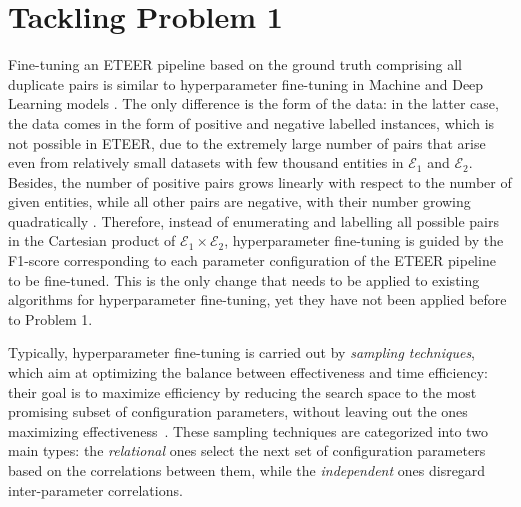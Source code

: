 \section{Tackling Problem 1}
\label{sec:problem-1}

Fine-tuning an ETEER pipeline based on the ground truth comprising all duplicate pairs is similar to hyperparameter fine-tuning in Machine and Deep Learning models \cite{DBLP:journals/ijon/YangS20}. The only difference is the form of the data: in the latter case, the data comes in the form of positive and negative labelled instances, which is not possible in ETEER, due to the extremely large number of pairs that arise even from relatively small datasets with few thousand entities in $\mathcal{E}_1$ and $\mathcal{E}_2$. Besides, the number of positive pairs grows linearly with respect to the number of given entities, while all other pairs are negative, with their number growing quadratically \cite{DBLP:journals/pvldb/GetoorM12}. Therefore, instead of enumerating and labelling all possible pairs in the Cartesian product of $\mathcal{E}_1 \times \mathcal{E}_2$, hyperparameter fine-tuning is guided by the F1-score corresponding %
to each parameter configuration of the ETEER pipeline to be fine-tuned. This is the only change that needs to be applied to existing algorithms for hyperparameter fine-tuning, yet they have not been applied before to Problem 1.

Typically, hyperparameter fine-tuning is carried out by \emph{sampling techniques}, which aim at optimizing the balance between effectiveness and time efficiency:  
their goal is to maximize efficiency by reducing the search space to the most promising subset of configuration parameters, without leaving out the ones maximizing effectiveness~\cite{OPTUNA}. 
These sampling techniques are categorized into two main types: 
the \textit{relational} ones select the next set of configuration parameters based on the correlations between them, while the \textit{independent} ones disregard inter-parameter correlations.

